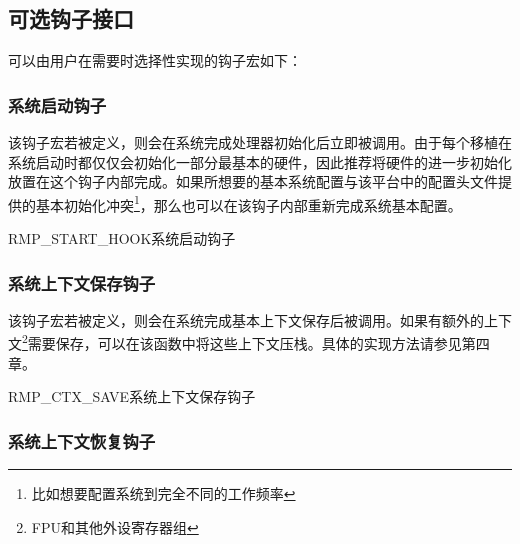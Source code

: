 \subsection{可选钩子接口}\label{subsec:optional-hook-interface}

可以由用户在需要时选择性实现的钩子宏如下：

\subsubsection{系统启动钩子}\label{subsubsec:system-start-hook}

该钩子宏若被定义，则会在系统完成处理器初始化后立即被调用。由于每个移植在系统启动时都仅仅会初始化一部分最基本的硬件，因此推荐将硬件的进一步初始化放置在这个钩子内部完成。如果所想要的基本系统配置与该平台中的配置头文件提供的基本初始化冲突\footnote{比如想要配置系统到完全不同的工作频率}，那么也可以在该钩子内部重新完成系统基本配置。

\begin{apidesc}{RMP\_START\_HOOK}{系统启动钩子}
    \begin{apiparams}
    \end{apiparams}
    \begin{apiret}
    \end{apiret}
\end{apidesc}

\subsubsection{系统上下文保存钩子}\label{subsubsec:system-context-save-hook}

该钩子宏若被定义，则会在系统完成基本上下文保存后被调用。如果有额外的上下文\footnote{FPU和其他外设寄存器组}需要保存，可以在该函数中将这些上下文压栈。具体的实现方法请参见第四章。

\begin{apidesc}{RMP\_CTX\_SAVE}{系统上下文保存钩子}
    \begin{apiparams}
    \end{apiparams}
    \begin{apiret}
    \end{apiret}
\end{apidesc}

\subsubsection{系统上下文恢复钩子}\label{subsubsec:system-context-restore-hook}

